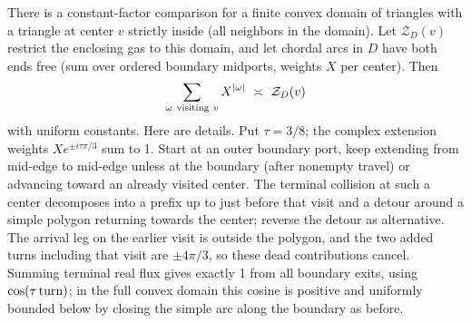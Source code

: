 \documentclass[11pt]{article}
\numberwithin{equation}{section}
\theoremstyle{definition}\newtheorem{definition}[theorem]{Definition}
\theoremstyle{remark}\newtheorem{remark}[theorem]{Remark}
\begin{document}
There is a constant-factor comparison for a finite convex domain of triangles with a triangle at center \(v\) strictly inside (all neighbors in the domain). Let \(\mathcal Z_D(v)\) restrict the enclosing gas to this domain, and let chordal arcs in \(D\) have both ends free (sum over ordered boundary midports, weights \(X\) per center). Then
\begin{equation}
  \sum_{\omega\ {\rm visiting}\ v} X^{|\omega|}\ \asymp\ \mathcal Z_D(v)\label{L:eq6}
\end{equation}
with uniform constants. Here are details. Put \(\tau=3/8\); the complex extension weights \(X e^{\pm i\tau\pi/3}\) sum to 1. Start at an outer boundary port, keep extending from mid-edge to mid-edge unless at the boundary (after nonempty travel) or advancing toward an already visited center. The terminal collision at such a center decomposes into a prefix up to just before that visit and a detour around a simple polygon returning towards the center; reverse the detour as alternative. The arrival leg on the earlier visit is outside the polygon, and the two added turns including that visit are \(\pm4\pi/3\), so these dead contributions cancel. Summing terminal real flux gives exactly 1 from all boundary exits, using \(\cos(\tau\,{\rm turn})\); in the full convex domain this cosine is positive and uniformly bounded below by closing the simple arc along the boundary as before.
\end{document}
